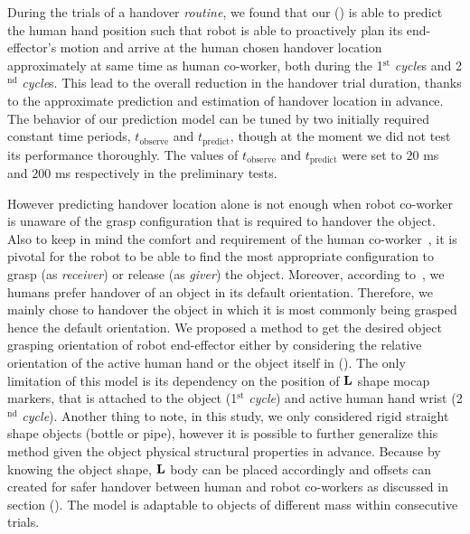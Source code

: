 During the trials of a handover \textit{routine}, we found that our () is able to predict the human hand position such that robot is able to proactively plan its end-effector's motion and arrive at the human chosen handover location approximately at same time as human co-worker, both during the 1$ {}^\text{st} $ \textit{cycle}s and 2$ {}^\text{nd} $ \textit{cycle}s. This lead to the overall reduction in the handover trial duration, thanks to the approximate prediction and estimation of handover location in advance. The behavior of our prediction model can be tuned by two initially required constant time periods, $t_\text{observe}$ and $t_\text{predict}$, though at the moment we did not test its performance thoroughly. The values of  $t_\text{observe}$ and $t_\text{predict}$ were set to $ 20 $ ms and $ 200 $ ms respectively in the preliminary tests.

 
However predicting handover location alone is not enough when robot co-worker is unaware of the grasp configuration that is required to handover the object. Also to keep in mind the comfort and requirement of the human co-worker~\cite{aleotti2012comfortable}, it is pivotal for the robot to be able to find the most appropriate configuration to grasp (as \textit{receiver}) or release (as \textit{giver}) the object. Moreover, according to~\cite{cakmak2011human}, we humans prefer handover of an object in its default orientation. Therefore, we mainly chose to handover the object in which it is most commonly being grasped hence the default orientation. We proposed a method to get the desired object grasping orientation of robot end-effector either by considering the relative orientation of the active human hand or the object itself in (). The only limitation of this model is its dependency on the position of $ {\bf L} $ shape mocap markers, that is attached to the object (1$ {}^\text{st} $ \textit{cycle}) and active human hand wrist (2$ {}^\text{nd} $ \textit{cycle}). Another thing to note, in this study, we only considered rigid straight shape objects (bottle or pipe), however it is possible to  further generalize this method given the object physical structural properties in advance. Because by knowing the object shape, $ {\bf L} $ body can be placed accordingly and offsets can created for safer handover between human and robot co-workers as discussed in section (). The model is adaptable to objects of different mass within consecutive trials.


